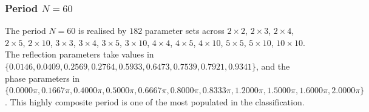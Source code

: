 \par
\subsubsection{Period $N = 60$}
The period $N=60$ is realised by $182$ parameter sets across $2\times2$, $2\times3$, $2\times4$, $2\times5$, $2\times10$, $3\times3$, $3\times4$, $3\times5$, $3\times10$, $4\times4$, $4\times5$, $4\times10$, $5\times5$, $5\times10$, $10\times10$. The reflection parameters take values in $\{0.0146, 0.0409, 0.2569, 0.2764, 0.5933, 0.6473, 0.7539, 0.7921, 0.9341\}$, and the phase parameters in $\{0.0000\pi, 0.1667\pi, 0.4000\pi, 0.5000\pi, 0.6667\pi, 0.8000\pi, 0.8333\pi, 1.2000\pi, 1.5000\pi, 1.6000\pi, 2.0000\pi\}$. This highly composite period is one of the most populated
in the classification.
